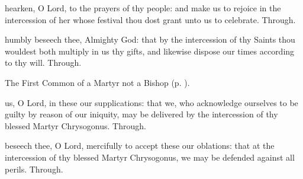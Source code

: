 \vspace{-0.2\baselineskip}

\secret\label{FelicitySecret}

\vspace{-0.1\baselineskip}

 hearken, O Lord, to the prayers of thy people: and make us to rejoice in the intercession of her whose festival thou dost grant unto us to celebrate. Through.

\vspace{-0.2\baselineskip}

\postcommunion\label{FelicityPostcommunion}

\vspace{-0.1\baselineskip}

 humbly beseech thee, Almighty God: that by the intercession of thy Saints thou wouldest both multiply in us thy gifts, and likewise dispose our times according to thy will. Through.


\clearpage
{}

\begin{secrubric}
	The First Common of a Martyr not a Bishop (p. \pageref{CommonMartyrNotBishopI}).
\end{secrubric}

\vspace{-0.75\baselineskip}

\collect

\vspace{-0.25\baselineskip}

 us, O Lord, in these our supplications: that we, who acknowledge ourselves to be guilty by reason of our iniquity, may be delivered by the intercession of thy blessed Martyr Chrysogonus. Through.

\vspace{-0.5\baselineskip}

\secret

\vspace{-0.25\baselineskip}

 beseech thee, O Lord, mercifully to accept these our oblations: that at the intercession of thy blessed Martyr Chrysogonus, we may be defended against all perils. Through.

